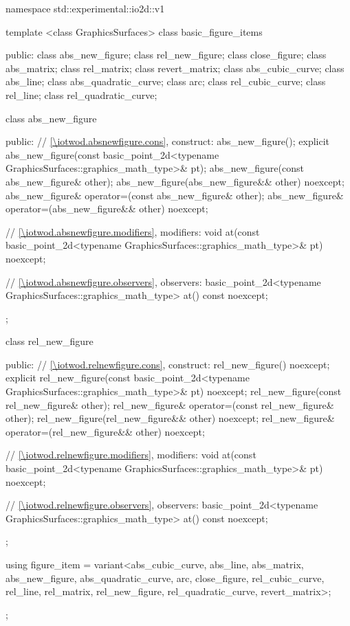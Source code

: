 \begin{codeblock}
namespace std::experimental::io2d::v1 {
  template <class GraphicsSurfaces>
  class basic_figure_items {
  public:
    class abs_new_figure;
    class rel_new_figure;
    class close_figure;
    class abs_matrix;
    class rel_matrix;
    class revert_matrix;
    class abs_cubic_curve;
    class abs_line;
    class abs_quadratic_curve;
    class arc;
    class rel_cubic_curve;
    class rel_line;
    class rel_quadratic_curve;

    class abs_new_figure {
    public:
      // \ref{\iotwod.absnewfigure.cons}, construct:
      abs_new_figure();
      explicit abs_new_figure(const basic_point_2d<typename
      GraphicsSurfaces::graphics_math_type>& pt);
      abs_new_figure(const abs_new_figure& other);
      abs_new_figure(abs_new_figure&& other) noexcept;
      abs_new_figure& operator=(const abs_new_figure& other);
      abs_new_figure& operator=(abs_new_figure&& other) noexcept;

      // \ref{\iotwod.absnewfigure.modifiers}, modifiers:
      void at(const basic_point_2d<typename GraphicsSurfaces::graphics_math_type>& pt) noexcept;

      // \ref{\iotwod.absnewfigure.observers}, observers:
      basic_point_2d<typename GraphicsSurfaces::graphics_math_type> at() const noexcept;
    };

    class rel_new_figure {
    public:
      // \ref{\iotwod.relnewfigure.cons}, construct:
      rel_new_figure() noexcept;
      explicit rel_new_figure(const basic_point_2d<typename GraphicsSurfaces::graphics_math_type>& pt) noexcept;
      rel_new_figure(const rel_new_figure& other);
      rel_new_figure& operator=(const rel_new_figure& other);
      rel_new_figure(rel_new_figure&& other) noexcept;
      rel_new_figure& operator=(rel_new_figure&& other) noexcept;

      // \ref{\iotwod.relnewfigure.modifiers}, modifiers:
      void at(const basic_point_2d<typename GraphicsSurfaces::graphics_math_type>& pt) noexcept;

      // \ref{\iotwod.relnewfigure.observers}, observers:
      basic_point_2d<typename GraphicsSurfaces::graphics_math_type> at() const noexcept;
    };

    using figure_item = variant<abs_cubic_curve, abs_line, abs_matrix, abs_new_figure,
      abs_quadratic_curve, arc, close_figure, rel_cubic_curve, rel_line, rel_matrix,
      rel_new_figure, rel_quadratic_curve, revert_matrix>;
  };

}
\end{codeblock}
